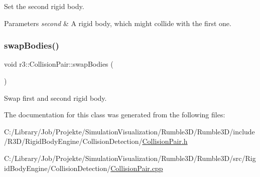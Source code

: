 Set the second rigid body. 


\begin{DoxyParams}{Parameters}
{\em second} & A rigid body, which might collide with the first one. \\
\hline
\end{DoxyParams}
\mbox{\label{classr3_1_1_collision_pair_a8ef5b5bae7be7db3ed2574ecd9e5bf9a}} 
\subsubsection{\texorpdfstring{swap\+Bodies()}{swapBodies()}}
{\footnotesize\ttfamily void r3\+::\+Collision\+Pair\+::swap\+Bodies (\begin{DoxyParamCaption}{ }\end{DoxyParamCaption})}



Swap first and second rigid body. 



The documentation for this class was generated from the following files\+:\begin{DoxyCompactItemize}
\item 
C\+:/\+Library/\+Job/\+Projekte/\+Simulation\+Visualization/\+Rumble3\+D/\+Rumble3\+D/include/\+R3\+D/\+Rigid\+Body\+Engine/\+Collision\+Detection/\mbox{\hyperlink{_collision_pair_8h}{Collision\+Pair.\+h}}\item 
C\+:/\+Library/\+Job/\+Projekte/\+Simulation\+Visualization/\+Rumble3\+D/\+Rumble3\+D/src/\+Rigid\+Body\+Engine/\+Collision\+Detection/\mbox{\hyperlink{_collision_pair_8cpp}{Collision\+Pair.\+cpp}}\end{DoxyCompactItemize}
